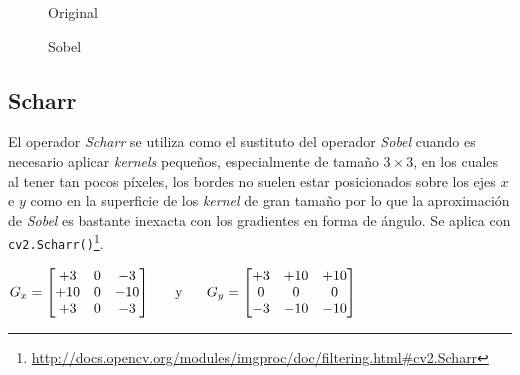 \begin{figure}[H]
  \caption{Original}
  \centering \setlength\fboxsep{0pt} \setlength\fboxrule{0.5pt}
\end{figure}

\begin{figure}[H]
  \centering \setlength\fboxsep{0pt} \setlength\fboxrule{0.5pt}
  \caption{Sobel}
\end{figure}

\subsection{Scharr}
El operador \emph{Scharr} se utiliza como el sustituto del operador
\emph{Sobel} cuando es necesario aplicar \emph{kernels} pequeños,
especialmente de tamaño $3 \times 3$, en los cuales al tener tan pocos
píxeles, los bordes no suelen estar posicionados sobre los ejes $x$ e
$y$ como en la superficie de los \emph{kernel} de gran tamaño por lo
que la aproximación de \emph{Sobel} es bastante inexacta con los
gradientes en forma de ángulo. Se aplica con
\texttt{cv2.Scharr()}\footnote{\url{http://docs.opencv.org/modules/imgproc/doc/filtering.html\#cv2.Scharr}}.
\begin{center}
  $ G_x = \begin{bmatrix}
    +3 & 0 & -3 \\
    +10 & 0 & -10 \\
    +3 & 0 & -3 \\
  \end{bmatrix}
  \hspace{0.5cm} \text{ y } \hspace{0.5cm} G_y = \begin{bmatrix}
    +3 & +10 & +10 \\
    0 & 0 & 0 \\
    -3 & -10 & -10 \\
  \end{bmatrix}
  $
\end{center}

